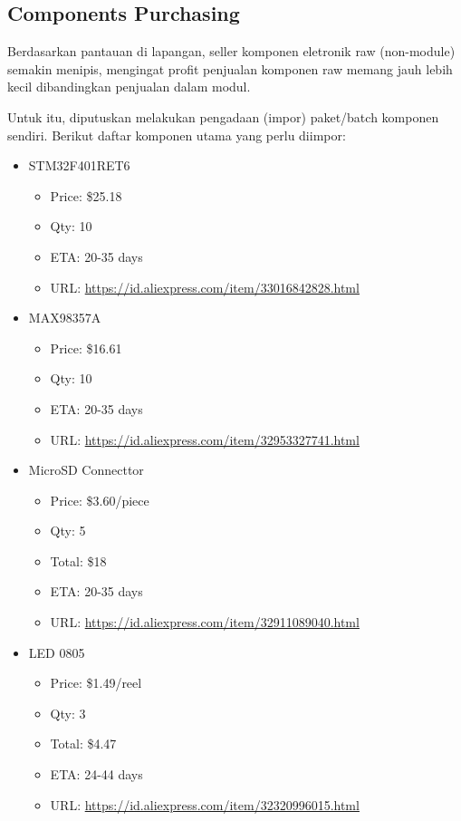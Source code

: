 \documentclass[12pt,]{article}
\begin{document}
	\newpage
	\subsection{Components Purchasing}    
	
	Berdasarkan pantauan di lapangan, seller komponen eletronik raw (non-module) semakin menipis,
	mengingat profit penjualan komponen raw memang jauh lebih kecil dibandingkan penjualan dalam modul.
	
	Untuk itu, diputuskan melakukan pengadaan (impor) paket/batch komponen sendiri.
	Berikut daftar komponen utama yang perlu diimpor:
	
	\begin{itemize}
		\item STM32F401RET6
		\begin{itemize}
			\item Price: \$25.18
			\item Qty: 10
			\item ETA: 20-35 days
			\item URL: \url{https://id.aliexpress.com/item/33016842828.html}
		\end{itemize}
	
		\item MAX98357A
		\begin{itemize}
			\item Price: \$16.61
			\item Qty: 10
			\item ETA: 20-35 days
			\item URL: \url{https://id.aliexpress.com/item/32953327741.html}
		\end{itemize}
	
		\item MicroSD Connecttor
		\begin{itemize}
			\item Price: \$3.60/piece
			\item Qty: 5
			\item Total: \$18
			\item ETA: 20-35 days
			\item URL: \url{https://id.aliexpress.com/item/32911089040.html}
		\end{itemize}
	
		\item LED 0805
		\begin{itemize}
			\item Price: \$1.49/reel
			\item Qty: 3 
			\item Total: \$4.47
			\item ETA: 24-44 days
			\item URL: \url{https://id.aliexpress.com/item/32320996015.html}
		\end{itemize}
	

\end{itemize}
\end{document}
